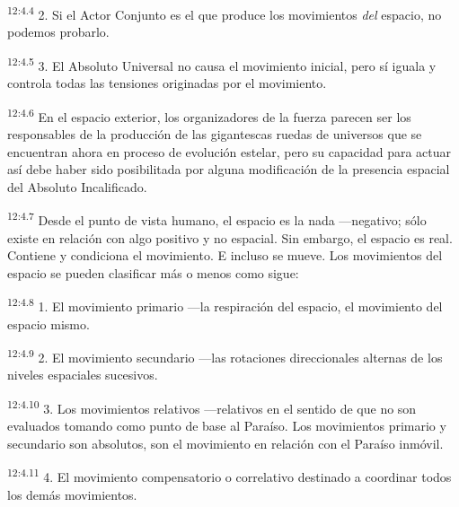 \par
\textsuperscript{12:4.4} 2. Si el Actor Conjunto es el que produce los movimientos \textit{del} espacio, no podemos probarlo.

\par
\textsuperscript{12:4.5} 3. El Absoluto Universal no causa el movimiento inicial, pero sí iguala y controla todas las tensiones originadas por el movimiento.

\par
\textsuperscript{12:4.6} En el espacio exterior, los organizadores de la fuerza parecen ser los responsables de la producción de las gigantescas ruedas de universos que se encuentran ahora en proceso de evolución estelar, pero su capacidad para actuar así debe haber sido posibilitada por alguna modificación de la presencia espacial del Absoluto Incalificado.

\par
\textsuperscript{12:4.7} Desde el punto de vista humano, el espacio es la nada ---negativo; sólo existe en relación con algo positivo y no espacial. Sin embargo, el espacio es real. Contiene y condiciona el movimiento. E incluso se mueve. Los movimientos del espacio se pueden clasificar más o menos como sigue:

\par
\textsuperscript{12:4.8} 1. El movimiento primario ---la respiración del espacio, el movimiento del espacio mismo.

\par
\textsuperscript{12:4.9} 2. El movimiento secundario ---las rotaciones direccionales alternas de los niveles espaciales sucesivos.

\par
\textsuperscript{12:4.10} 3. Los movimientos relativos ---relativos en el sentido de que no son evaluados tomando como punto de base al Paraíso. Los movimientos primario y secundario son absolutos, son el movimiento en relación con el Paraíso inmóvil.

\par
\textsuperscript{12:4.11} 4. El movimiento compensatorio o correlativo destinado a coordinar todos los demás movimientos.

